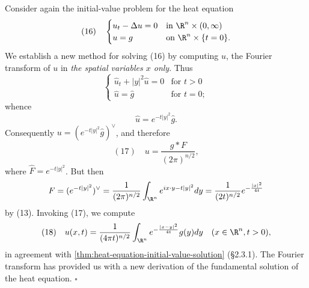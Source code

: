 \begin{example}
\label{ex:fourier-transform-heat-fundamental-solution}
Consider again the initial-value problem for the heat equation
$$(16) \quad \begin{cases} u_t - \Delta u = 0 & \text{in } \R^n \times (0,\infty) \\ u = g & \text{on } \R^n \times \{t = 0\}. \end{cases}$$
We establish a new method for solving (16) by computing $\hat{u}$, the Fourier transform of $u$ in \textit{the spatial variables $x$ only}. Thus
$$\begin{cases} \hat{u}_t + |y|^2 \hat{u} = 0 & \text{for } t > 0 \\ \hat{u} = \hat{g} & \text{for } t = 0; \end{cases}$$
whence
$$\hat{u} = e^{-t|y|^2} \hat{g}.$$
Consequently $u = (e^{-t|y|^2} \hat{g})^\vee$, and therefore
$$(17) \quad u = \frac{g * F}{(2\pi)^{n/2}},$$
where $\hat{F} = e^{-t|y|^2}$. But then
$$F = (e^{-t|y|^2})^\vee = \frac{1}{(2\pi)^{n/2}} \int_{\R^n} e^{ix \cdot y - t|y|^2} dy = \frac{1}{(2t)^{n/2}} e^{-\frac{|x|^2}{4t}}$$
by (13). Invoking (17), we compute
$$(18) \quad u(x,t) = \frac{1}{(4\pi t)^{n/2}} \int_{\R^n} e^{-\frac{|x-y|^2}{4t}} g(y) dy \quad (x \in \R^n, t > 0),$$
in agreement with \cref{thm:heat-equation-initial-value-solution} (\S2.3.1). The Fourier transform has provided us with a new derivation of the fundamental solution of the heat equation. $\square$
\end{example}

